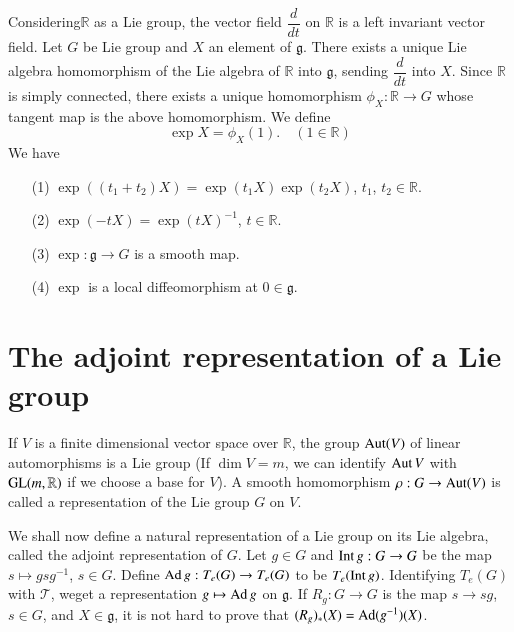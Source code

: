 Considering\pageoriginale $\mathbb{R}$ as a Lie group, the vector field $\dfrac{d}{dt}$ on $\mathbb{R}$ is a left invariant vector field. Let $G$ be Lie group and $X$ an element of $\mathfrak{g}$. There exists a unique Lie algebra homomorphism of the Lie algebra of $\mathbb{R}$ into $\mathfrak{g}$, sending $\dfrac{d}{dt}$ into $X$. Since $\mathbb{R}$ is simply connected, there exists a unique homomorphism $\phi_{X}:\mathbb{R}\to G$ whose tangent map is the above homomorphism. We define
\begin{equation*}
\exp X=\phi_{X}(1).\quad (1\in \mathbb{R})
\end{equation*}
We have
\begin{itemize}
\item[(1)] $\exp((t_{1}+t_{2})X)=\exp(t_{1}X)\exp(t_{2}X)$, $t_{1}$, $t_{2}\in \mathbb{R}$.

\item[(2)] $\exp(-tX)=\exp(tX)^{-1}$, $t\in \mathbb{R}$.

\item[(3)] $\exp :\mathfrak{g}\to G$ is a smooth map.

\item[(4)] $\exp$ is a local diffeomorphism at $0\in \mathfrak{g}$.
\end{itemize}

\section*{The adjoint representation of a Lie group}

If $V$ is a finite dimensional vector space over $\mathbb{R}$, the group $\operatorname{Aut}(V)$ of linear automorphisms is a Lie group (If $\dim V=m$, we can identify $\operatorname{Aut} V$ with $\operatorname{GL}(m,\mathbb{R})$ if we choose a base for $V$). A smooth homomorphism $\rho:G\to \operatorname{Aut}(V)$ is called a representation of the Lie group $G$ on $V$.

We shall now define a natural representation of a Lie group on its Lie algebra, called the adjoint representation of $G$. Let $g\in G$ and $\operatorname{Int} g : G\to G$ be the map $s\mapsto gsg^{-1}$, $s\in G$. Define $\operatorname{Ad} g:T_{e}(G)\to T_{e}(G)$ to be $T_{e}(\operatorname{Int} g)$. Identifying $T_{e}(G)$ with $\mathscr{T}$, we\pageoriginale get a representation $g\mapsto \operatorname{Ad} g$ on $\mathfrak{g}$. If $R_{g}:G\to G$ is the map $s\to sg$, $s\in G$, and $X\in \mathfrak{g}$, it is not hard to prove that $(R_{g})_{*}(X)=\operatorname{Ad} (g^{-1})(X)$.





